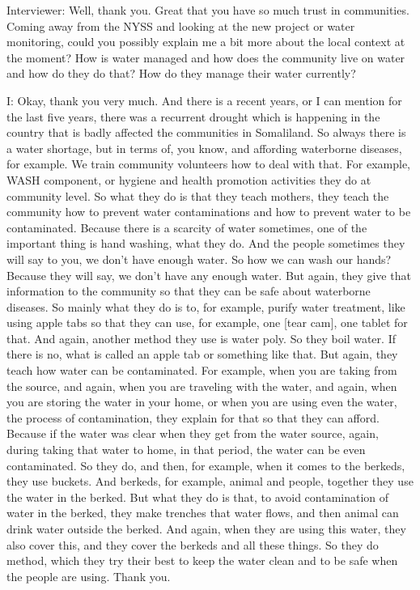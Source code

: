 Interviewer:  Well, thank you. Great that you have so much trust in communities. Coming away from the NYSS and looking at the new project or water monitoring, could you possibly explain me a bit more about the local context at the moment? How is water managed and how does the community live on water and how do they do that? How do they manage their water currently? 

I: Okay, thank you very much. And there is a recent years, or I can mention for the last five years, there was a recurrent drought which is happening in the country that is badly affected the communities in Somaliland. So always there is a water shortage, but in terms of, you know, and affording waterborne diseases, for example. We train community volunteers how to deal with that. For example, WASH component, or hygiene and health promotion activities they do at community level. So what they do is that they teach mothers, they teach the community how to prevent water contaminations and how to prevent water to be contaminated. Because there is a scarcity of water sometimes, one of the important thing is hand washing, what they do. And the people sometimes they will say to you, we don't have enough water. So how we can wash our hands? Because they will say, we don't have any enough water. But again, they give that information to the community so that they can be safe about waterborne diseases. So mainly what they do is to, for example, purify water treatment, like using apple tabs so that they can use, for example, one [tear cam], one tablet for that. And again, another method they use is water poly. So they boil water. If there is no, what is called an apple tab or something like that. But again, they teach how water can be contaminated. For example, when you are taking from the source, and again, when you are traveling with the water, and again, when you are storing the water in your home, or when you are using even the water, the process of contamination, they explain for that so that they can afford. Because if the water was clear when they get from the water source, again, during taking that water to home, in that period, the water can be even contaminated. So they do, and then, for example, when it comes to the berkeds, they use buckets. And berkeds, for example, animal and people, together they use the water in the berked. But what they do is that, to avoid contamination of water in the berked, they make trenches that water flows, and then animal can drink water outside the berked. And again, when they are using this water, they also cover this, and they cover the berkeds and all these things. So they do method, which they try their best to keep the water clean and to be safe when the people are using. Thank you.

